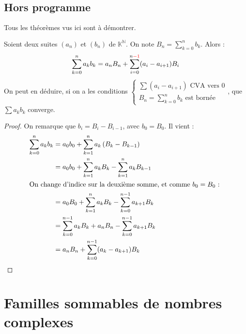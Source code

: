 \documentclass[11pt,a4paper,fleqn,pdftex]{report}
\begin{document}
\section{Hors programme} %
\label{sec:hors_programme}
Tous les théorèmes vus ici sont à démontrer.
\begin{itheorem}
    Soient deux suites $(a_n)$ et $(b_n)$ de $\mathbb{K}^\mathbb{N}$. On note $B_n = \sum_{k=0}^n b_k$. Alors :
    \begin{equation}
    \sum_{k=0}^n a_k b_k = a_n B_n + \sum_{i=0}^{n\textcolor{couleurImp}{-1}} (a_i - a_{i+1}) B_i
    \end{equation}
    On peut en déduire, si on a les conditions $\left\lbrace \begin{array}{l}
        \sum (a_i - a_{i+1}) \text{ CVA vers }0 \\
        B_n = \sum_{k=0}^n b_k \text{ est bornée}
    \end{array}\right.$, que $\sum a_k b_k$ converge.
\end{itheorem}
\begin{proof}
    On remarque que $b_i = B_{i} - B_{i-1}$, avec $b_0 = B_0$. Il vient : 
    \begin{align*}
        \sum_{k=0}^n a_k b_k    &= a_0 b_0 + \sum_{k=1}^n a_k \left( B_k - B_{k-1} \right) \\
                                &= a_0 b_0 + \sum_{k=1}^n a_k B_k - \sum_{k=1}^n a_k B_{k-1} \\
                                \intertext{On change d'indice sur la deuxième somme, et comme $b_0 = B_0$ : }
                                &=  a_0 B_0 + \sum_{k=1}^n a_k B_k - \sum_{k=0}^{n-1} a_{k+1} B_k \\
                                &= \sum_{k=0}^{n-1} a_k B_k + a_n B_n - \sum_{k=0}^{n-1} a_{k+1} B_k \\
                                &= a_n B_n + \sum_{k=0}^{n-1} (a_{k} - a_{k+1}) B_k
    \end{align*}
\end{proof}
\chapter{Familles sommables de nombres complexes} %
\label{cha:familles_sommables_de_nombres_complexes}
\end{document}
